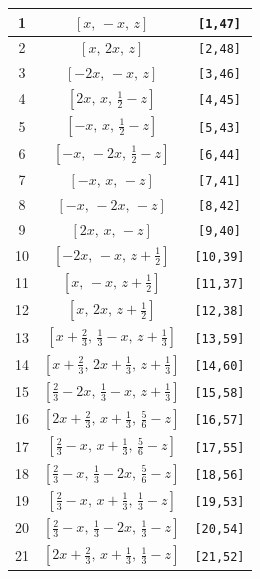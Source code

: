 \documentclass[fleqn,8pt]{jsarticle}
\begin{document}
\begin{longtable}{ccc}
1 & $\left[ x,\, - x,\, z \right]$ & {\tt [1,47]} \\ \hline
2 & $\left[ x,\, 2 x,\, z \right]$ & {\tt [2,48]} \\ \hline
3 & $\left[ - 2 x,\, - x,\, z \right]$ & {\tt [3,46]} \\ \hline
4 & $\left[ 2 x,\, x,\, \frac{1}{2} - z \right]$ & {\tt [4,45]} \\ \hline
5 & $\left[ - x,\, x,\, \frac{1}{2} - z \right]$ & {\tt [5,43]} \\ \hline
6 & $\left[ - x,\, - 2 x,\, \frac{1}{2} - z \right]$ & {\tt [6,44]} \\ \hline
7 & $\left[ - x,\, x,\, - z \right]$ & {\tt [7,41]} \\ \hline
8 & $\left[ - x,\, - 2 x,\, - z \right]$ & {\tt [8,42]} \\ \hline
9 & $\left[ 2 x,\, x,\, - z \right]$ & {\tt [9,40]} \\ \hline
10 & $\left[ - 2 x,\, - x,\, z + \frac{1}{2} \right]$ & {\tt [10,39]} \\ \hline
11 & $\left[ x,\, - x,\, z + \frac{1}{2} \right]$ & {\tt [11,37]} \\ \hline
12 & $\left[ x,\, 2 x,\, z + \frac{1}{2} \right]$ & {\tt [12,38]} \\ \hline
13 & $\left[ x + \frac{2}{3},\, \frac{1}{3} - x,\, z + \frac{1}{3} \right]$ & {\tt [13,59]} \\ \hline
14 & $\left[ x + \frac{2}{3},\, 2 x + \frac{1}{3},\, z + \frac{1}{3} \right]$ & {\tt [14,60]} \\ \hline
15 & $\left[ \frac{2}{3} - 2 x,\, \frac{1}{3} - x,\, z + \frac{1}{3} \right]$ & {\tt [15,58]} \\ \hline
16 & $\left[ 2 x + \frac{2}{3},\, x + \frac{1}{3},\, \frac{5}{6} - z \right]$ & {\tt [16,57]} \\ \hline
17 & $\left[ \frac{2}{3} - x,\, x + \frac{1}{3},\, \frac{5}{6} - z \right]$ & {\tt [17,55]} \\ \hline
18 & $\left[ \frac{2}{3} - x,\, \frac{1}{3} - 2 x,\, \frac{5}{6} - z \right]$ & {\tt [18,56]} \\ \hline
19 & $\left[ \frac{2}{3} - x,\, x + \frac{1}{3},\, \frac{1}{3} - z \right]$ & {\tt [19,53]} \\ \hline
20 & $\left[ \frac{2}{3} - x,\, \frac{1}{3} - 2 x,\, \frac{1}{3} - z \right]$ & {\tt [20,54]} \\ \hline
21 & $\left[ 2 x + \frac{2}{3},\, x + \frac{1}{3},\, \frac{1}{3} - z \right]$ & {\tt [21,52]} \\ \hline

\end{longtable}
\end{document}

